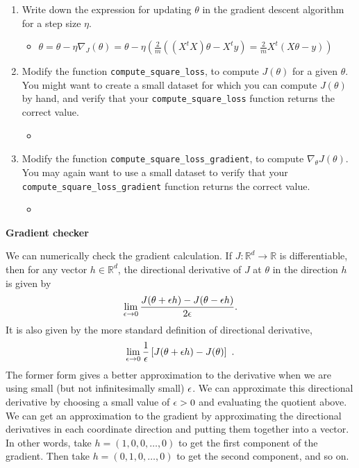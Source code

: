 \documentclass{article}
\newcommand{\nyuparagrah}[1]{\textcolor{nyupurple}{\large #1}}
\begin{document}
\begin{enumerate}
\item Write down the expression for updating $\theta$ in the gradient descent
algorithm for a step size $\eta$.
\begin{itemize}
    \item $\theta=\theta-\eta\nabla_{J}(\theta)=\theta-\eta(\frac{2}{m}((X^{t}X)\theta-X^{t}y)=\frac{2}{m}X^{t}(X\theta-y))$
\end{itemize}
\item Modify the function \texttt{compute\_square\_loss}, to compute $J(\theta)$
for a given $\theta$. You might want to create a small dataset for
which you can compute $J(\theta)$ by hand, and verify that your \texttt{compute\_square\_loss}
function returns the correct value.
\begin{itemize}
    \item \inputminted[firstline=39, lastline=52, breaklines=True]{python}{HW_2.PY.py}
\end{itemize}


\item Modify the function \texttt{compute\_square\_loss\_gradient}, to compute
$\nabla_{\theta}J(\theta)$. You may again want to use a small dataset
to verify that your \texttt{compute\_square\_loss\_gradient} function
returns the correct value.
\setcounter{saveenum}{\value{enumi}}
\begin{itemize}
    \item \inputminted[firstline=57, lastline=72, breaklines=True]{python}{HW_2.PY.py}
\end{itemize}


\end{enumerate}

\nyuparagrah{\bf Gradient checker}

We can numerically check the
gradient calculation. If $J:\mathbb{R}^{d}\to\mathbb{R}$ is differentiable,
then for any vector $h\in\mathbb{R}^{d}$, the directional derivative
of $J$ at $\theta$ in the direction $h$ is given by
\[
\lim_{{\epsilon}\to0}\frac{J(\theta+{\epsilon} h)-J(\theta-{\epsilon} h)}{2{\epsilon}}.
\]
It is also given by the more standard definition of directional
derivative, $$\lim_{{\epsilon}\to0}\frac{1}{{\epsilon}}\left[J(\theta+{\epsilon} h)-J(\theta)\right] \ .$$
The former form gives a better approximation to the derivative when
we are using small (but not infinitesimally small) ${\epsilon}$. We can approximate this directional derivative by choosing a small
value of ${\epsilon}>0$ and evaluating the quotient above. We can get an
approximation to the gradient by approximating the directional derivatives
in each coordinate direction and putting them together into a vector.
In other words, take $h=\left(1,0,0,\ldots,0\right)$ to get the first
component of the gradient. Then take $h=(0,1,0,\ldots,0)$ to get
the second component, and so on. 
\end{document}
